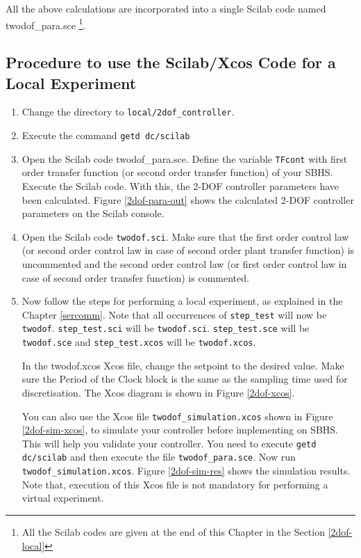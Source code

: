 All the above calculations are incorporated into a single Scilab code named {\ttfamily twodof\_para.sce} \footnote{All the Scilab codes are given at the end of this Chapter in the Section \ref{2dof-local}}.
\subsection{Procedure to use the Scilab/Xcos Code for a Local Experiment }\label{sec-steps}
\begin{enumerate}
\item Change the directory to {\tt local/2dof\_controller}. 
\item Execute the command {\tt getd dc/scilab}
\item Open the Scilab code {\ttfamily twodof\_para.sce}. Define the variable {\tt TFcont} with first order transfer function (or second order transfer function) of your SBHS. Execute the Scilab code. With this, the 2-DOF controller parameters have been calculated. Figure \ref{2dof-para-out} shows the calculated 2-DOF controller parameters on the Scilab console.

\item Open the Scilab code {\tt twodof.sci}. Make sure that the first order control law (or second order control law in case of second order plant transfer function) is uncommented and the second order control law (or first order control law in case of second order transfer function) is commented.
\item Now follow the steps for performing a local experiment, as explained in the Chapter \ref{sercomm}. Note that all occurrences of {\tt step\_test} will now be {\tt twodof}. {\tt step\_test.sci} will be {\tt twodof.sci}. {\tt  step\_test.sce} will  be {\tt twodof.sce} and {\tt step\_test.xcos} will be {\tt twodof.xcos}.

In the {\ttfamily twodof.xcos} Xcos file, change the setpoint to the desired value. Make sure the Period of the Clock block is the same as the sampling time used for discretisation.  The Xcos diagram is shown in Figure \ref{2dof-xcos}. 

You can also use the Xcos file {\tt twodof\_simulation.xcos} shown in Figure \ref{2dof-sim-xcos}, to simulate your controller before implementing on SBHS. This will help you validate your controller. You need to execute {\tt getd dc/scilab} and then execute the file {\tt twodof\_para.sce}. Now run {\tt twodof\_simulation.xcos}. Figure \ref{2dof-sim-res} shows the simulation results. Note that, execution of this Xcos file is not mandatory for performing a virtual experiment.
\end{enumerate}


